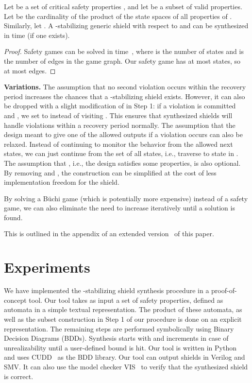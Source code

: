 \documentclass{llncs}
\newcommand{\buchi}{B\"uchi\xspace}
\newif \ifextended
\begin{document}
\begin{theorem}
Let  be a set of critical safety 
properties  , and let  be a subset of valid properties. 
 Let  be the cardinality 
of the product of the state spaces of all properties of . 
Similarly, let . A 
-stabilizing generic shield with respect to  
and  can be synthesized in  time
(if one exists).
\end{theorem}
\begin{proof}
Safety games can be solved in  time~\cite{Mazala01}, where  
is the number of states and  is the number of edges in the game 
graph.  Our safety game  has at most  states, 
so at most  edges. 
\end{proof}

\noindent
\textbf{Variations.}
The assumption that no second violation occurs within the recovery 
period increases the chances that a -stabilizing shield exists.  
However, it can also be dropped with a slight 
modification of  in Step 1: if a violation is committed and 
, we set  to  instead of visiting .  This ensures 
that synthesized shields will handle violations within a 
recovery period normally.  
The assumption that the design meant to give one of the allowed outputs 
if a violation occurs can also be relaxed.  Instead of continuing to 
monitor the behavior from the allowed next states, we can just continue 
from the set of all states, i.e., traverse to state  in 
.  The assumption that , i.e., the 
design satisfies some properties, is also optional.  By removing 
 and , the construction can be 
simplified at the cost of less implementation freedom for the shield.

By solving a \buchi game (which is potentially more expensive) instead 
of a safety game, we can also eliminate the need to increase  
iteratively until a solution is found. 
\ifextended
This is outlined in Appendix~\ref{sec:app}.
\else
This is outlined in the appendix of an extended version~\cite{extended} 
of this paper.
\fi

\section{Experiments} 
\label{sec:exp}

We have implemented the -stabilizing shield synthesis procedure in a 
proof-of-concept tool.  Our tool takes as input a set of safety 
properties, defined as automata in a simple textual representation. The 
product of these automata, as well as the subset construction in Step 1 
of our procedure is done on an explicit representation.  The remaining 
steps are performed symbolically using Binary Decision Diagrams (BDDs).  
Synthesis starts with  and increments  in case of 
unrealizability until a user-defined bound is hit.  Our tool is written 
in Python and uses CUDD~\cite{Somenz95} as the BDD library.  Our tool 
can output shields in Verilog and SMV. It can also use the model checker 
VIS~\cite{VIS96} to verify that the synthesized shield is correct.
\end{document}

